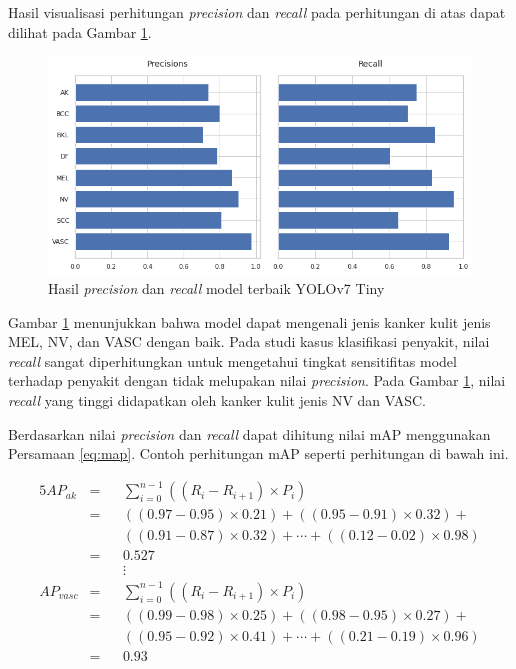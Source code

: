 Hasil visualisasi perhitungan \textit{precision} dan \textit{recall} pada perhitungan di atas dapat dilihat pada Gambar \ref{fig:d-pr-yolov7tiny}.

\begin{figure}[H]
    \begin{center}
        \includegraphics[width=12cm]{img/bab4/pr-yolov7tiny.png}
        \caption{Hasil \textit{precision} dan \textit{recall} model terbaik YOLOv7 Tiny}
        \label{fig:d-pr-yolov7tiny}
    \end{center}
\end{figure}

Gambar \ref{fig:d-pr-yolov7tiny} menunjukkan bahwa model dapat mengenali jenis kanker kulit jenis MEL, NV, dan VASC dengan baik. Pada studi kasus klasifikasi penyakit, nilai \textit{recall} sangat diperhitungkan untuk mengetahui tingkat sensitifitas model terhadap penyakit dengan tidak melupakan nilai \textit{precision}. Pada Gambar \ref{fig:d-pr-yolov7tiny}, nilai \textit{recall} yang tinggi didapatkan oleh kanker kulit jenis NV dan VASC.

Berdasarkan nilai \textit{precision} dan \textit{recall} dapat dihitung nilai mAP menggunakan Persamaan \ref{eq:map}. Contoh perhitungan mAP seperti perhitungan di bawah ini.

\begin{alignat*}{5}
    AP_{ak}     &= &&\sum_{i=0}^{n-1} \left( (R_i - R_{i+1})\times P_i \right) \\
                &= &&\left( (0.97-0.95)\times 0.21 \right) + \left( (0.95-0.91)\times 0.32 \right) + \\
                &  &&\left( (0.91-0.87)\times 0.32 \right) + \cdots + \left( (0.12 - 0.02)\times 0.98 \right) \\
                &= &&0.527 \\
                &  &&\vdots \\
    AP_{vasc}   &= &&\sum_{i=0}^{n-1} \left( (R_i - R_{i+1})\times P_i \right) \\
                &= &&\left( (0.99-0.98)\times 0.25 \right) + \left( (0.98-0.95)\times 0.27 \right) + \\
                &  &&\left( (0.95-0.92)\times 0.41 \right) + \cdots + \left( (0.21 - 0.19)\times 0.96 \right) \\
                &= &&0.93
\end{alignat*}


